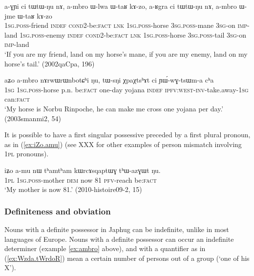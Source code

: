  \begin{exe}
\ex \label{ex:ambro} 
\gll a-ɣɲi ci tɯ\redp{}tɯ-ŋu nɤ, a-mbro ɯ-lwa ɯ-taʁ kɤ-zo, a-ʁgra ci tɯ\redp{}tɯ-ŋu nɤ, a-mbro ɯ-jme ɯ-taʁ kɤ-zo \\
\textsc{1sg.poss}-friend \textsc{indef} \textsc{cond}\redp{}2-be:\textsc{fact} \textsc{lnk} \textsc{1sg.poss}-horse \textsc{3sg.poss}-mane \textsc{3sg}-on \textsc{imp}-land \textsc{1sg.poss}-enemy \textsc{indef} \textsc{cond}\redp{}2-be:\textsc{fact} \textsc{lnk} \textsc{1sg.poss}-horse \textsc{3sg.poss}-tail  \textsc{3sg}-on \textsc{imp}-land  \\
\glt `If you are my friend, land on my horse's mane, if you are my enemy, land on my horse's tail.' (2002qaCpa, 196)
\end{exe}

\begin{exe}
\ex \label{ex:aZo.ambro}
\gll aʑo a-mbro nɤrwɯrɯnbotɕʰi ŋu, tɯ-sŋi χpaχtsʰɤt ci ɲɯ́-wɣ-tsɯm-a cʰa \\
\textsc{1sg} \textsc{1sg.poss}-horse p.n. be:\textsc{fact} one-day yojana \textsc{indef} \textsc{ipfv:west}-\textsc{inv}-take.away-\textsc{1sg} can:\textsc{fact} \\
\glt `My horse is Norbu Rinpoche, he can make me cross one yojana per day.' (2003smanmi2, 54)
\end{exe}

It is possible to have a first singular possessive preceded by a first plural pronoun, as in (\ref{ex:iZo.amu}) (see XXX for other examples of person mismatch involving \textsc{1pl} pronouns).

\begin{exe}
\ex \label{ex:iZo.amu}
\gll iʑo a-mu nɯ tʰamtʰam kɯrcɤsqaptɯɣ tʰɯ-azɣɯt ŋu. \\
\textsc{1pl} \textsc{1sg.poss}-mother \textsc{dem} now 81 \textsc{pfv}-reach  be:\textsc{fact} \\
\glt `My mother is now 81.' (2010-histoire09-2, 15)
\end{exe}

\subsubsection{Definiteness and obviation}
Nouns with a definite possessor in Japhug can be indefinite, unlike in most languages of Europe. Nouns with a definite possessor can occur an indefinite determiner (example \ref{ex:ambro}  above), and with a quantifier as in (\ref{ex:Wzda.tWrdoR}) mean a certain number of persons out of a group (`one of his X').

